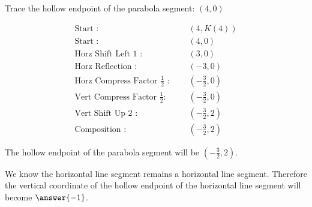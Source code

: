 \documentclass{ximera}
\begin{document}
\begin{question} 



Trace the hollow endpoint of the parabola segment: $(4, 0)$





\begin{align*}
\text{Start :} & \text{  } & (4, K(4))  \\
\text{Start :} & \text{  } & (4, 0) \\
\text{Horz Shift Left $1$ :} & \text{  } & \left( 3, 0 \right)   \\
\text{Horz Reflection :} & \text{  } & \left( -3, 0 \right)   \\
\text{Horz Compress Factor $\tfrac{1}{2}$ :}  & \text{  } & \left( -\frac{3}{2}, 0 \right)   \\
\text{Vert Compress Factor $\tfrac{1}{2}$:} & \text{  } & \left( -\frac{3}{2}, 0 \right)   \\
\text{Vert Shift Up $2$ :} & \text{  } & \left( -\frac{3}{2}, 2 \right)   \\
\text{Composition :} & \text{  } & \left( -\frac{3}{2}, 2 \right)   
\end{align*}


The hollow endpoint of the parabola segment will be $\left( -\frac{3}{2}, 2 \right)$.

\end{question}













\begin{question} 

We know the horizontal line segment remains a horizontal line segment. Therefore the vertical coordinate of the hollow endpoint of the horizontal line segment will become $\answer{-1}$.

\end{question}
\end{document}
